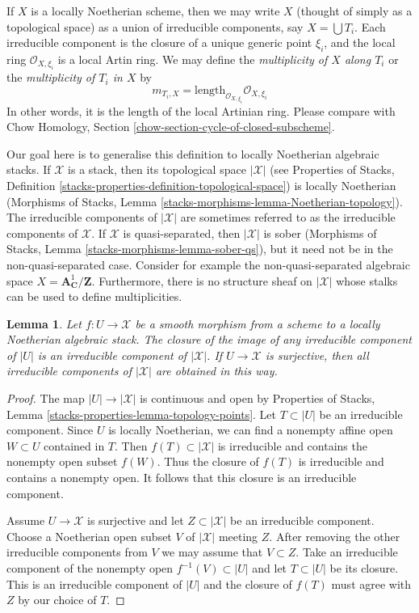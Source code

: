 \documentclass{stacks-project}
\theoremstyle{plain}
\newtheorem{lemma}[subsection]{Lemma}
\theoremstyle{definition}
\theoremstyle{remark}
\numberwithin{equation}{subsection}
\begin{document}
\noindent
If $X$ is a locally Noetherian scheme, then we may write $X$ (thought
of simply as a topological space) as a union of irreducible components,
say $X = \bigcup T_i$.  Each irreducible component is the closure of a
unique generic point $\xi_i$, and the local ring $\mathcal O_{X,\xi_i}$
is a local Artin ring. We may define the {\it multiplicity of $X$ along $T_i$}
or the {\it multiplicity of $T_i$ in $X$} by
$$
m_{T_i, X} = \text{length}_{\mathcal O_{X, \xi_i}} \mathcal O_{X, \xi_i}
$$
In other words, it is the length of the local Artinian ring. Please
compare with
Chow Homology, Section \ref{chow-section-cycle-of-closed-subscheme}.

\medskip\noindent
Our goal here is to generalise this definition to locally
Noetherian algebraic stacks. If $\mathcal{X}$ is a stack,
then its topological space $|\mathcal{X}|$
(see Properties of Stacks, Definition
\ref{stacks-properties-definition-topological-space})
is locally Noetherian
(Morphisms of Stacks, Lemma \ref{stacks-morphisms-lemma-Noetherian-topology}).
The irreducible components of $|\mathcal{X}|$ are sometimes
referred to as the irreducible components of $\mathcal{X}$.
If $\mathcal{X}$ is quasi-separated, then $|\mathcal{X}|$
is sober (Morphisms of Stacks, Lemma
\ref{stacks-morphisms-lemma-sober-qs}),
but it need not be in the
non-quasi-separated case. Consider for example the non-quasi-separated
algebraic space $X = \mathbf{A}^1_\mathbf{C}/\mathbf{Z}$.
Furthermore, there is no structure sheaf
on $|\mathcal{X}|$ whose stalks can be used to define multiplicities.

\begin{lemma}
\label{lemma-map-of-components}
Let $f : U \to \mathcal{X}$ be a smooth morphism from a scheme
to a locally Noetherian algebraic stack. The closure of the image of any
irreducible component of $|U|$ is an irreducible component of $|\mathcal{X}|$.
If $U \to \mathcal{X}$ is surjective, then all irreducible components of
$|\mathcal{X}|$ are obtained in this way.
\end{lemma}

\begin{proof}
The map $|U| \to |\mathcal{X}|$ is continuous and open by
Properties of Stacks, Lemma \ref{stacks-properties-lemma-topology-points}.
Let $T \subset |U|$ be an irreducible component. Since $U$ is locally
Noetherian, we can find a nonempty affine open $W \subset U$ contained in $T$.
Then $f(T) \subset |\mathcal{X}|$ is irreducible and contains the
nonempty open subset $f(W)$. Thus the closure of $f(T)$ is irreducible and
contains a nonempty open. It follows that this closure is an irreducible
component.

\medskip\noindent
Assume $U \to \mathcal{X}$ is surjective and let $Z \subset |\mathcal{X}|$
be an irreducible component. Choose a Noetherian open subset $V$
of $|\mathcal{X}|$ meeting $Z$. After removing the other irreducible
components from $V$ we may assume that $V \subset Z$.
Take an irreducible component of the nonempty
open $f^{-1}(V) \subset |U|$ and let $T \subset |U|$ be its closure.
This is an irreducible component of $|U|$ and the closure of $f(T)$
must agree with $Z$ by our choice of $T$.
\end{proof}
\end{document}
